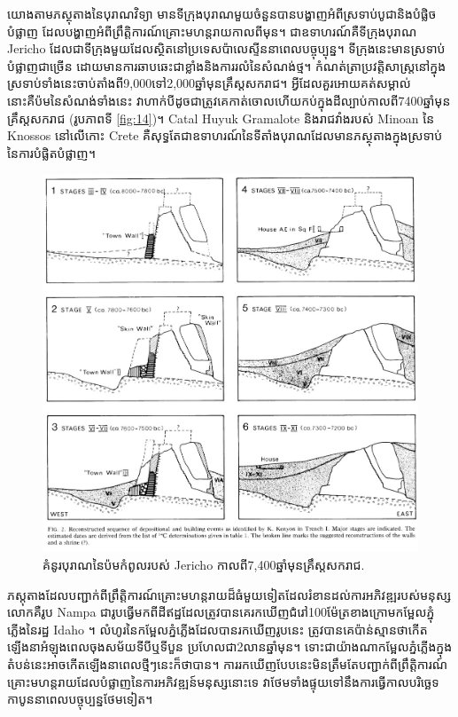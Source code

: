 \documentclass[10pt,twocolumn,letterpaper]{article}
\begin{document}
យោងតាមភស្ថុតាងនៃបុរាណវិទ្យា មានទីក្រុងបុរាណមួយចំនួនបានបង្ហាញអំពីស្រទាប់បូជានិងបំផ្លិចបំផ្លាញ ដែលបង្ហាញអំពីព្រឹត្តិការណ៍គ្រោះមហន្តរាយកាលពីមុន។ ជាឧទាហរណ៍គឺទីក្រុងបុរាណ Jericho ដែលជាទីក្រុងមួយដែលស្ថិតនៅប្រទេសប៉ាលេស្ទីននាពេលបច្ចុប្បុន្ន។ ទីក្រុងនេះមានស្រទាប់បំផ្លាញជាច្រើន ដោយមានការឆាបឆេះជាខ្លាំងនិងការរលំនៃសំណង់ថ្ម\cite{96,97}។ កំណត់ត្រាប្រវត្តិសាស្ត្រនៅក្នុងស្រទាប់ទាំងនេះចាប់តាំងពី9,000ទៅ2,000ឆ្នាំមុនគ្រឹស្តសករាជ។ អ្វីដែលគួរអោយគត់សម្គាល់នោះគឺប៉មនៃសំណង់ទាំងនេះ វាហាក់បីដូចជាត្រូវគេកាត់ចោលហើយកប់ក្នុងដីល្បាប់កាលពី7400ឆ្នាំមុនគ្រឹស្តសករាជ (រូបភាពទី \ref{fig:14})\cite{95}។ Catal Huyuk \cite{99} Gramalote \cite{98} និងរាជវាំងរបស់ Minoan នៃ Knossos នៅលើកោះ Crete\cite{100,101} គឺសុទ្ធតែជាឧទាហរណ៍នៃទីតាំងបុរាណដែលមានភស្ថុតាងក្នុងស្រទាប់នៃការបំផ្លិតបំផ្លាញ។

\begin{figure}[t]
\begin{center}

   \includegraphics[width=1\linewidth]{jericho.jpg}
\end{center}
   \caption{គំនូរបុរាណនៃប៉មកំពូលរបស់ Jericho កាលពី7,400ឆ្នាំមុនគ្រឹស្តសករាជ\cite{95}.}
\label{fig:14}
\label{fig:onecol}
\end{figure}

ភស្តុតាងដែលបញ្ជាក់ពីព្រឹត្តិការណ៍គ្រោះមហន្តរាយដ៏ធំមួយទៀតដែលរំខានដល់ការអភិវឌ្ឍរបស់មនុស្សលោកគឺរូប Nampa ជារូបធ្វើមកពីដីឥដ្ឋដែលត្រូវបានគេរកឃើញជំរៅ100ម៉ែត្រខាងក្រោមកម្អែលភ្នុំភ្លើងនៃរដ្ឋ Idaho \cite{102,103}។ លំហូរនៃកម្អែលភ្នំភ្លើងដែលបានរកឃើញរូបនេះ ត្រូវបានគេប៉ាន់ស្មានថាកើតឡើងនាអំឡុងពេលចុងសម័យទីបីឬទីបួន ប្រហែលជា2លានឆ្នាំមុន។ ទោះជាយ៉ាងណាកម្អែលភ្នំភ្លើងក្នុងតំបន់នេះអាចកើតឡើងនាពេលថ្មីៗនេះក៏ថាបាន។ ការរកឃើញបែបនេះមិនត្រឹមតែបញ្ជាក់ពីព្រឹត្តិការណ៍គ្រោះមហន្តរាយដែលបំផ្លាញនៃការអភិវឌ្ឍន៍មនុស្សនោះទេ វាថែមទាំងផ្ទុយទៅនឹងការធ្វើកាលបរិច្ឆេទកាបូននាពេលបច្ចុប្បន្នថែមទៀត។
\end{document}
